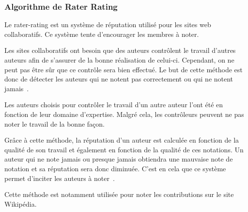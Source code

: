 \documentclass[a4paper, 11pt]{article} %
\begin{document}
\subsubsection{Algorithme de Rater Rating}
Le rater-rating est un système de réputation utilisé pour les sites web collaboratifs. Ce système tente d'encourager les membres à noter.

Les sites collaboratifs ont besoin que des auteurs contrôlent le travail d'autres auteurs afin de s'assurer de la bonne réalisation de celui-ci. Cependant, on ne peut pas être sûr que ce contrôle sera bien effectué. Le but de cette méthode est donc de détecter les auteurs qui ne notent pas correctement ou qui ne notent jamais~\cite{RaterRating}.

Les auteurs choisis pour contrôler le travail d'un autre auteur l'ont été en fonction de leur domaine d'expertise. Malgré cela, les contrôleurs peuvent ne pas noter le travail de la bonne façon.

Grâce à cette méthode, la réputation d'un auteur est calculée en fonction de la qualité de son travail et également en fonction de la qualité de ces notations. Un auteur qui ne note jamais ou presque jamais obtiendra une mauvaise note de notation et sa réputation sera donc diminuée. C'est en cela que ce système permet d'inciter les auteurs à noter~\cite{RaterRating}.

Cette méthode est notamment utilisée pour noter les contributions sur le site Wikipédia. 
\end{document}
